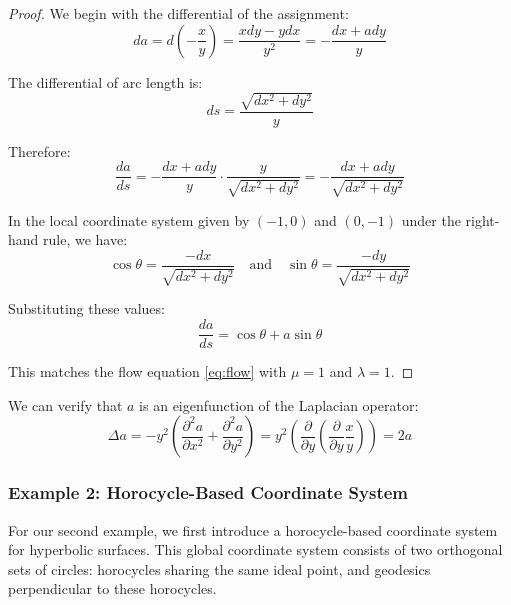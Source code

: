 \begin{proof}
We begin with the differential of the assignment:
$$
da = d\left(-\frac{x}{y}\right) = \frac{xdy - ydx}{y^2} = -\frac{dx + ady}{y}
$$

The differential of arc length is:
$$
ds = \frac{\sqrt{dx^2 + dy^2}}{y}
$$

Therefore:
$$
\frac{da}{ds} = - \frac{dx + ady}{y} \cdot \frac{y}{\sqrt{dx^2 + dy^2}} = - \frac{dx + ady}{\sqrt{dx^2 + dy^2}}
$$

In the local coordinate system given by $(-1, 0)$ and $(0, -1)$ under the right-hand rule, we have:
$$
\cos \theta = \frac{-dx}{\sqrt{dx^2 + dy^2}} \quad \text{and} \quad \sin \theta = \frac{-dy}{\sqrt{dx^2 + dy^2}}
$$

Substituting these values:
$$
\frac{da}{ds} = \cos \theta + a \sin \theta
$$

This matches the flow equation \eqref{eq:flow} with $\mu=1$ and $\lambda=1$.
\end{proof}

We can verify that $a$ is an eigenfunction of the Laplacian operator:
$$
\Delta a = - y^2 \left(\frac{\partial^2 a}{\partial x^2} + \frac{\partial^2 a}{\partial y^2}\right) = y^2 \left(\frac{\partial}{\partial y} \left(\frac{\partial}{\partial y} \frac{x}{y}\right)\right) = 2a
$$

\subsubsection{Example 2: Horocycle-Based Coordinate System}

For our second example, we first introduce a horocycle-based coordinate system for hyperbolic surfaces. This global coordinate system consists of two orthogonal sets of circles: horocycles sharing the same ideal point, and geodesics perpendicular to these horocycles.

